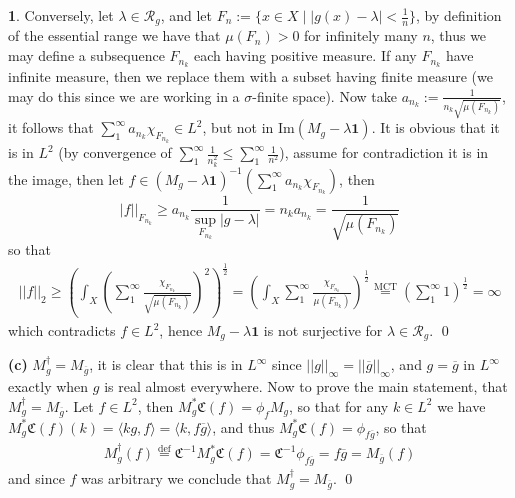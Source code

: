 \documentclass[11pt]{article}
\theoremstyle{definition}
\newtheorem{pb}{}
\newcommand{\set}[1]{\{#1\}}
\newcommand{\abs}[1]{\left\vert#1\right\vert}
\newcommand{\norm}[1]{\lvert\lvert#1\rvert\rvert}
\newcommand{\im}{\text{Im}}
\newcommand{\gen}[1]{\langle #1 \rangle}
\begin{document}
\begin{pb}
        Conversely, let \(\lambda \in \mathcal{R}_g\), and let \(F_n := \set{x \in X \mid \abs{g(x) - \lambda} < \frac{1}{n}}\), by definition of the essential range we have that \(\mu(F_n) > 0\) for infinitely many \(n\), thus we may define a subsequence \(F_{n_k}\) each having positive measure. If any \(F_{n_k}\) have infinite measure, then we replace them with a subset having finite measure (we may do this since we are working in a \(\sigma\)-finite space). Now take \(a_{n_k} := \frac{1}{n_{k}\sqrt{\mu(F_{n_k})}}\), it follows that \(\sum_1^\infty a_{n_k}\chi_{F_{n_k}} \in L^2\), but not in \(\im(M_{g} - \lambda\mathbf{1})\). It is obvious that it is in \(L^2\) (by convergence of \(\sum_1^\infty \frac{1}{n_k^2}\leq\sum_1^\infty \frac{1}{n^2}\)), assume for contradiction it is in the image, then let \(f \in (M_{g} - \lambda\mathbf{1})^{-1}(\sum_1^\infty a_{n_k}\chi_{F_{n_k}})\), then 
        \[\abs{f}\vert_{F_{n_k}} \geq a_{n_k}\frac{1}{\sup_{F_{n_k}}\abs{g - \lambda}} = n_ka_{n_k} = \frac{1}{\sqrt{\mu(F_{n_k})}}\]
        so that
        \begin{align*}
            \norm{f}_2 \geq \left(\int_X \left(\sum_1^\infty \frac{\chi_{F_{n_k}}}{\sqrt{\mu(F_{n_k})}}\right)^2\right)^{\frac12} = \left(\int_X\sum_1^\infty \frac{\chi_{F_{n_k}}}{\mu(F_{n_k})}\right)^{\frac12} \overset{\text{MCT}}{=} \left(\sum_1^\infty 1\right)^{\frac12} = \infty
        \end{align*}
        which contradicts \(f \in L^2\), hence \(M_g - \lambda\mathbf{1}\) is not surjective for \(\lambda \in \mathcal{R}_g\). \qed

        \textbf{(c)} \(M_g^\dagger = M_{\overline{g}}\), it is clear that this is in \(L^\infty\) since \(\norm{g}_\infty = \norm{\overline{g}}_\infty\), and \(g = \overline{g}\) in \(L^\infty\) exactly when \(g\) is real almost everywhere. Now to prove the main statement, that \(M_g^\dagger = M_{\overline{g}}\). Let \(f \in L^2\), then \(M_g^* \mathfrak{C}(f) = \phi_f M_g\), so that for any \(k \in L^2\) we have \(M_g^* \mathfrak{C}(f)(k) = \gen{kg,f} = \gen{k,f \overline{g}}\), and thus \(M_g^* \mathfrak{C}(f) = \phi_{f \overline{g}}\), so that
        \begin{align*}
            M_g^\dagger(f) \overset{\text{def}}{=} \mathfrak{C}^{-1}M_g^*\mathfrak{C}(f) = \mathfrak{C}^{-1}\phi_{f \overline{g}} = f \overline{g} = M_{\overline{g}}(f)
        \end{align*}
        and since \(f\) was arbitrary we conclude that \(M_g^\dagger = M_{\overline{g}}\). \qed
    \end{pb}
\end{document}
